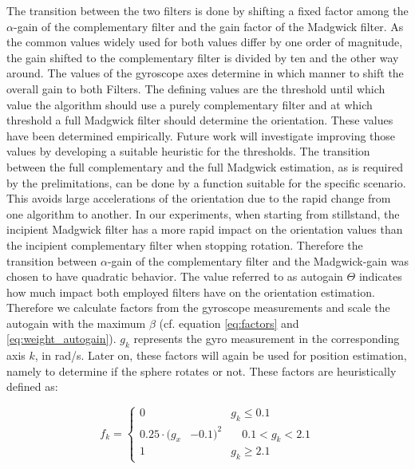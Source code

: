 \documentclass[letterpaper, 10 pt, conference]{ieeeconf}  %
\begin{document}
The transition between the two filters is done by shifting a fixed factor among the $\alpha$-gain of the complementary filter and the gain factor of the Madgwick filter.
 As the common values widely used for both values differ by one order of magnitude, the gain shifted to the complementary filter is divided by ten and the other way around.
 The values of the gyroscope axes determine in which manner to shift the overall gain to both Filters. 
 The defining values are the threshold until which value the algorithm should use a purely complementary filter and at which threshold a full Madgwick filter should determine the orientation. 
 These values have been determined empirically.
 Future work will investigate improving those values by developing a suitable heuristic for the thresholds.
 The transition between the full complementary and the full Madgwick estimation, as is required by the prelimitations,  can be done by a function suitable for the specific scenario.
 This avoids large accelerations of the orientation due to the rapid change from one algorithm to another.
 In our experiments, when starting from stillstand, the incipient Madgwick filter has a more rapid impact on the orientation values than the incipient complementary filter when stopping rotation. 
Therefore the transition between $\alpha$-gain of the complementary filter and the Madgwick-gain was chosen to have quadratic behavior. 
The value referred to as autogain $\Theta$ indicates how much impact both employed filters have on the orientation estimation. 
Therefore we calculate factors from the gyroscope measurements and scale the autogain with the maximum $\beta$ (cf. equation \ref{eq:factors} and \ref{eq:weight_autogain}).
$g_{k}$ represents the gyro measurement in the corresponding axis $k$, in rad/s. Later on, these factors will again be used for position estimation, namely to determine if the sphere rotates or not.
These factors are heuristically defined as:

\begin{equation}
f_k =
\left\{
\begin{aligned}
0& & g_k \leq 0.1  \\ 
0.25\cdot (g_x&-0.1)^2& \quad 0.1< g_k <2.1 \\
 1& & g_k \geq 2.1
\end{aligned}
\label{eq:factors}
\right.
\end{equation}
\end{document}
